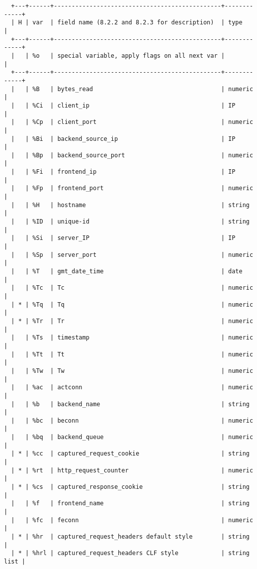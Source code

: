 \begin{verbatim}
  +---+------+-----------------------------------------------+-------------+
  | H | var  | field name (8.2.2 and 8.2.3 for description)  | type        |
  +---+------+-----------------------------------------------+-------------+
  |   | %o   | special variable, apply flags on all next var |             |
  +---+------+-----------------------------------------------+-------------+
  |   | %B   | bytes_read                                    | numeric     |
  |   | %Ci  | client_ip                                     | IP          |
  |   | %Cp  | client_port                                   | numeric     |
  |   | %Bi  | backend_source_ip                             | IP          |
  |   | %Bp  | backend_source_port                           | numeric     |
  |   | %Fi  | frontend_ip                                   | IP          |
  |   | %Fp  | frontend_port                                 | numeric     |
  |   | %H   | hostname                                      | string      |
  |   | %ID  | unique-id                                     | string      |
  |   | %Si  | server_IP                                     | IP          |
  |   | %Sp  | server_port                                   | numeric     |
  |   | %T   | gmt_date_time                                 | date        |
  |   | %Tc  | Tc                                            | numeric     |
  | * | %Tq  | Tq                                            | numeric     |
  | * | %Tr  | Tr                                            | numeric     |
  |   | %Ts  | timestamp                                     | numeric     |
  |   | %Tt  | Tt                                            | numeric     |
  |   | %Tw  | Tw                                            | numeric     |
  |   | %ac  | actconn                                       | numeric     |
  |   | %b   | backend_name                                  | string      |
  |   | %bc  | beconn                                        | numeric     |
  |   | %bq  | backend_queue                                 | numeric     |
  | * | %cc  | captured_request_cookie                       | string      |
  | * | %rt  | http_request_counter                          | numeric     |
  | * | %cs  | captured_response_cookie                      | string      |
  |   | %f   | frontend_name                                 | string      |
  |   | %fc  | feconn                                        | numeric     |
  | * | %hr  | captured_request_headers default style        | string      |
  | * | %hrl | captured_request_headers CLF style            | string list |

\end{verbatim}
